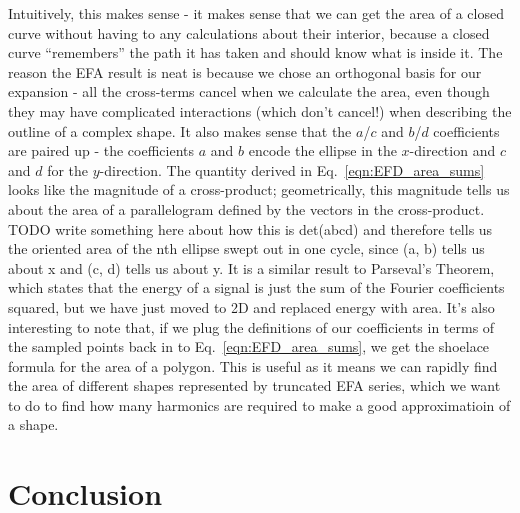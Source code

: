 \documentclass[11pt,a4paper,notitlepage]{article}
\begin{document}
Intuitively, this makes sense - it makes sense that we can get the area of a closed curve without having to any calculations about their interior,
because a closed curve ``remembers'' the path it has taken and should know what is inside it.
The reason the EFA result is neat is because we chose an orthogonal basis for our expansion - all the cross-terms
cancel when we calculate the area, even though they may have complicated interactions (which don't cancel!) when describing the outline of a complex shape.
It also makes sense that the $a$/$c$ and $b$/$d$ coefficients are paired up - the coefficients
$a$ and $b$ encode the ellipse in the $x$-direction and $c$ and $d$ for the $y$-direction.
The quantity derived in Eq.~\ref{eqn:EFD_area_sums} looks like the magnitude of a cross-product; geometrically, this magnitude tells us about
the area of a parallelogram defined by the vectors in the cross-product. TODO write something here about how this is det(abcd) and therefore tells us the oriented area of the nth ellipse swept out in one cycle, since (a, b) tells us about x and (c, d) tells us about y.
It is a similar result to Parseval's Theorem, which
states that the energy of a signal is just the sum of the Fourier coefficients squared, but we have just moved to 2D and replaced
energy with area. It's also interesting to note that, if we plug the definitions of our coefficients in terms of the sampled points back in to Eq.~\ref{eqn:EFD_area_sums},
we get the shoelace formula for the area of a polygon.
\bigbreak
This is useful as it means we can rapidly find the area of different shapes represented by truncated EFA series,
which we want to do to find how many harmonics are required to make a good approximatioin of a shape.

\section{Conclusion}



\end{document}
